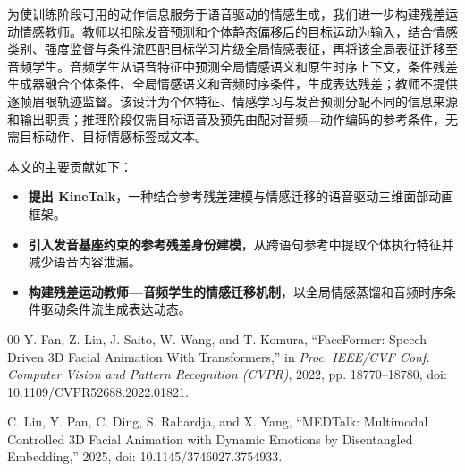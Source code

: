 \documentclass[conference]{IEEEtran}
\begin{document}
为使训练阶段可用的动作信息服务于语音驱动的情感生成，我们进一步构建残差运动情感教师。教师以扣除发音预测和个体静态偏移后的目标运动为输入，结合情感类别、强度监督与条件流匹配目标学习片级全局情感表征，再将该全局表征迁移至音频学生。音频学生从语音特征中预测全局情感语义和原生时序上下文，条件残差生成器融合个体条件、全局情感语义和音频时序条件，生成表达残差；教师不提供逐帧眉眼轨迹监督。该设计为个体特征、情感学习与发音预测分配不同的信息来源和输出职责；推理阶段仅需目标语音及预先由配对音频—动作编码的参考条件，无需目标动作、目标情感标签或文本。

本文的主要贡献如下：
\begin{itemize}
  \item \textbf{提出 KineTalk}，一种结合参考残差建模与情感迁移的语音驱动三维面部动画框架。
  \item \textbf{引入发音基座约束的参考残差身份建模}，从跨语句参考中提取个体执行特征并减少语音内容泄漏。
  \item \textbf{构建残差运动教师—音频学生的情感迁移机制}，以全局情感蒸馏和音频时序条件驱动条件流生成表达动态。
\end{itemize}

\begin{thebibliography}{00}
 Y. Fan, Z. Lin, J. Saito, W. Wang, and T. Komura, ``FaceFormer: Speech-Driven 3D Facial Animation With Transformers,'' in \emph{Proc. IEEE/CVF Conf. Computer Vision and Pattern Recognition (CVPR)}, 2022, pp. 18770--18780, doi: 10.1109/CVPR52688.2022.01821.

 C. Liu, Y. Pan, C. Ding, S. Rahardja, and X. Yang, ``MEDTalk: Multimodal Controlled 3D Facial Animation with Dynamic Emotions by Disentangled Embedding,'' 2025, doi: 10.1145/3746027.3754933.
\end{thebibliography}
\end{document}
